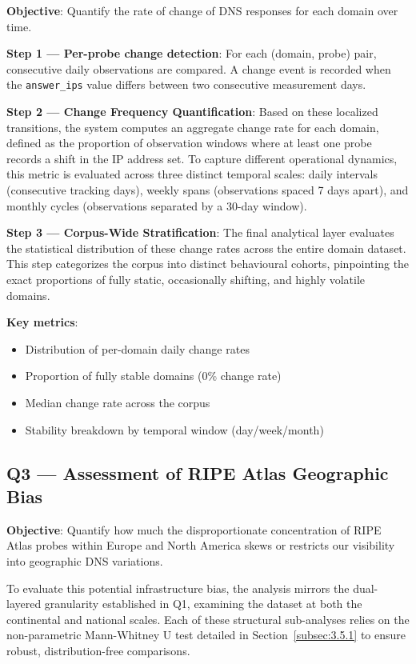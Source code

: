 \textbf{Objective}: Quantify the rate of change of \ac{DNS} responses for each domain over time.

\textbf{Step 1 --- Per-probe change detection}: For each (domain, probe) pair, consecutive daily observations are compared. A change event is recorded when the \texttt{answer\_ips} value differs between two consecutive measurement days.

\textbf{Step 2 --- Change Frequency Quantification}: Based on these localized transitions, the system computes an aggregate change rate for each domain, defined as the proportion of observation windows where at least one probe records a shift in the \ac{IP} address set. To capture different operational dynamics, this metric is evaluated across three distinct temporal scales: daily intervals (consecutive tracking days), weekly spans (observations spaced 7 days apart), and monthly cycles (observations separated by a 30-day window).

\textbf{Step 3 --- Corpus-Wide Stratification}: The final analytical layer evaluates the statistical distribution of these change rates across the entire domain dataset. This step categorizes the corpus into distinct behavioural cohorts, pinpointing the exact proportions of fully static, occasionally shifting, and highly volatile domains.

\textbf{Key metrics}:
\begin{itemize}
  \item Distribution of per-domain daily change rates
  \item Proportion of fully stable domains (0\% change rate)
  \item Median change rate across the corpus
  \item Stability breakdown by temporal window (day/week/month)
\end{itemize}

\subsection{Q3 --- Assessment of RIPE Atlas Geographic Bias}
\label{subsec:3.5.4}

\textbf{Objective}: Quantify how much the disproportionate concentration of RIPE Atlas probes within Europe and North America skews or restricts our visibility into geographic \ac{DNS} variations.

To evaluate this potential infrastructure bias, the analysis mirrors the dual-layered granularity established in Q1, examining the dataset at both the continental and national scales. Each of these structural sub-analyses relies on the non-parametric Mann-Whitney U test detailed in Section~\ref{subsec:3.5.1} to ensure robust, distribution-free comparisons.

